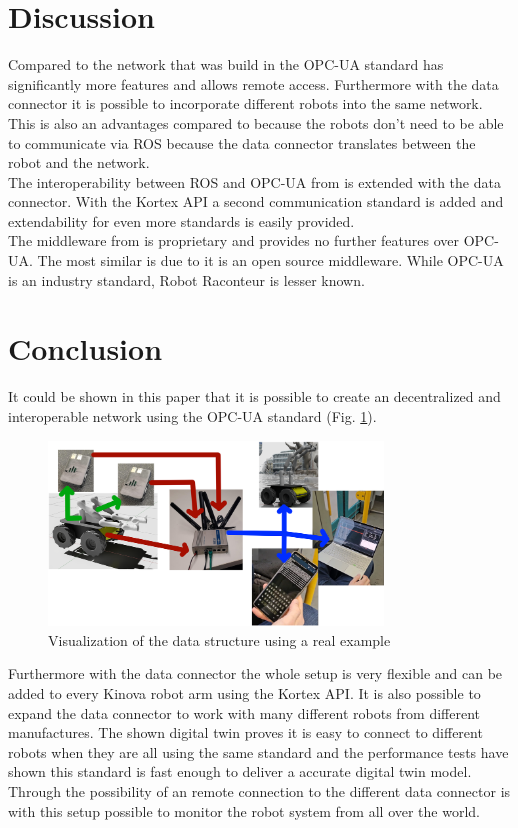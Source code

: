 \documentclass[conference]{IEEEtran}
\begin{document}
\section{Discussion}
Compared to the network that was build in \cite{SotaCAN} the OPC-UA standard has significantly more features and allows remote access.
Furthermore with the data connector it is possible to incorporate different robots into the same network.
This is also an advantages compared to \cite{SotaROS} because the robots don't need to be able to communicate via ROS because the data connector translates between the robot and the network.\\
The interoperability between ROS and OPC-UA from \cite{StoaROStoOPCUA} is extended with the data connector.
With the Kortex API a second communication standard is added and extendability for even more standards is easily provided.\\
The middleware from \cite{SotaFusion} is proprietary and provides no further features over OPC-UA.
The most similar is \cite{SotaRaconteur} due to it is an open source middleware.
While OPC-UA is an industry standard, Robot Raconteur is lesser known.
\section{Conclusion}
It could be shown in this paper that it is possible to create an decentralized and interoperable network using the OPC-UA standard (Fig. \ref{fig:AufbauBilder}).\\

\begin{figure}[htbp]
    \centerline{\includegraphics[width=8.9cm]{Pictures/AufbauBilder.png}}
    \caption{Visualization of the data structure using a real example}
    \label{fig:AufbauBilder}
\end{figure}
Furthermore with the data connector the whole setup is very flexible and can be added to every Kinova robot arm using the Kortex API.
It is also possible to expand the data connector to work with many different robots from different manufactures.
The shown digital twin proves it is easy to connect to different robots when they are all using the same standard and the performance tests have shown this standard is fast enough to deliver a accurate digital twin model.
Through the possibility of an remote connection to the different data connector is with this setup possible to monitor the robot system from all over the world.
\end{document}
